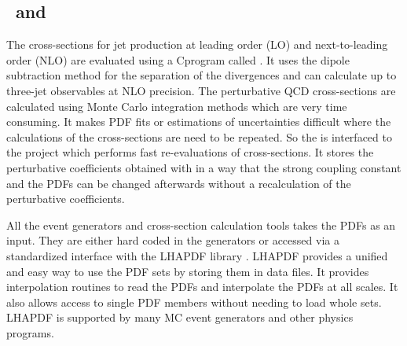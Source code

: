 \subsection{\NLOJET~and \fastNLO}
The cross-sections for jet production at leading order (LO) and next-to-leading order (NLO) are evaluated using a C\plusn\plus program called \NLOJETPP \cite{Nagy:2001fj,Nagy:2003tz}. It uses the dipole subtraction method for the separation of the divergences and can calculate up to three-jet observables at NLO precision. The perturbative QCD cross-sections are calculated using Monte Carlo integration methods which are very time consuming. It makes PDF fits or estimations of uncertainties difficult where the calculations of the cross-sections are need to be repeated. So the \NLOJETPP is interfaced to the \fastNLO project \cite{Kluge:2006xs,Britzger:2012bs} which performs fast re-evaluations of cross-sections. It stores the perturbative coefficients obtained with \NLOJETPP in a way that the strong coupling constant and the PDFs can be changed afterwards without a recalculation of the perturbative coefficients.

All the event generators and cross-section calculation tools takes the PDFs as an input. They are either hard coded in the generators or accessed via a standardized interface with the LHAPDF library \cite{Whalley:2005nh,Buckley:2014ana}. LHAPDF provides a unified and easy way to use the PDF sets by storing them in data files. It provides interpolation routines to read the PDFs and interpolate the PDFs at all scales. It also allows access to single PDF members without needing to load whole sets. LHAPDF is supported by many MC event generators and other physics programs.

